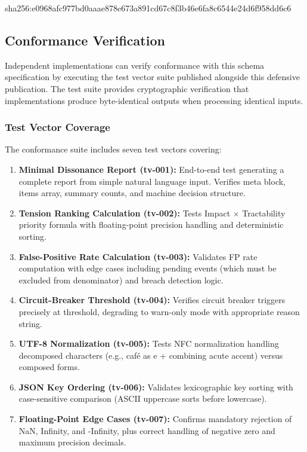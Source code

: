 \documentclass[11pt,a4paper]{article}
\begin{document}
sha256:e0968afc977bd0aaae878e673a891cd67c8f3b46e6fa8c6544e24d6f958dd6c6

\subsection{Conformance Verification}

Independent implementations can verify conformance with this schema 
specification by executing the test vector suite published alongside 
this defensive publication. The test suite provides cryptographic 
verification that implementations produce byte-identical outputs 
when processing identical inputs.

\subsubsection{Test Vector Coverage}

The conformance suite includes seven test vectors covering:

\begin{enumerate}
\item \textbf{Minimal Dissonance Report (tv-001):} End-to-end test 
generating a complete report from simple natural language input. 
Verifies meta block, items array, summary counts, and machine 
decision structure.

\item \textbf{Tension Ranking Calculation (tv-002):} Tests Impact × 
Tractability priority formula with floating-point precision handling 
and deterministic sorting.

\item \textbf{False-Positive Rate Calculation (tv-003):} Validates FP 
rate computation with edge cases including pending events (which must 
be excluded from denominator) and breach detection logic.

\item \textbf{Circuit-Breaker Threshold (tv-004):} Verifies circuit 
breaker triggers precisely at threshold, degrading to warn-only mode 
with appropriate reason string.

\item \textbf{UTF-8 Normalization (tv-005):} Tests NFC normalization 
handling decomposed characters (e.g., café as e + combining acute accent) 
versus composed forms.

\item \textbf{JSON Key Ordering (tv-006):} Validates lexicographic 
key sorting with case-sensitive comparison (ASCII uppercase sorts 
before lowercase).

\item \textbf{Floating-Point Edge Cases (tv-007):} Confirms mandatory 
rejection of NaN, Infinity, and -Infinity, plus correct handling of 
negative zero and maximum precision decimals.
\end{enumerate}
\end{document}
